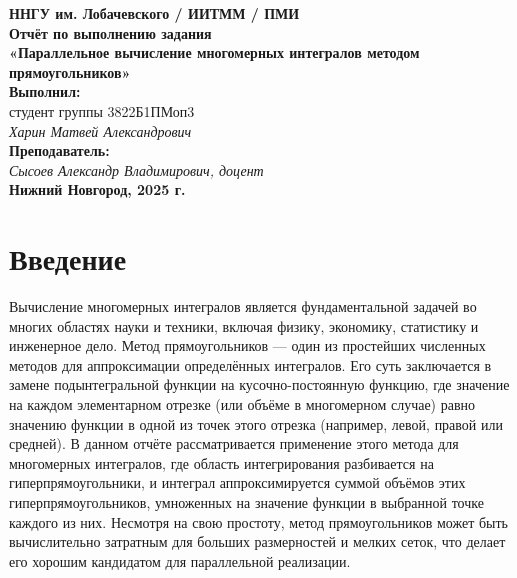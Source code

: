 \documentclass[12pt]{article}
\begin{document}
\begin{titlepage}
    \begin{center}
        \large
        \textbf{ННГУ им. Лобачевского / ИИТММ / ПМИ}\\[0.5cm]

        \vspace{4cm}
        \textbf{\Large Отчёт по выполнению задания}\\
        \textbf{\large «Параллельное вычисление многомерных интегралов методом прямоугольников»}\\[3cm] %

        \vspace{3cm}
        \textbf{Выполнил:}\\
        студент группы 3822Б1ПМоп3 \\
        \textit{Харин Матвей Александрович}\\[1cm]

        \textbf{Преподаватель:}\\
        \textit{Сысоев Александр Владимирович, доцент}\\[2cm]

        \vfill
        \textbf{Нижний Новгород, 2025 г.}
    \end{center}
\end{titlepage}

\tableofcontents
\newpage

\section{Введение}
Вычисление многомерных интегралов является фундаментальной задачей во многих областях науки и техники, включая физику, экономику, статистику и инженерное дело. Метод прямоугольников — один из простейших численных методов для аппроксимации определённых интегралов. Его суть заключается в замене подынтегральной функции на кусочно-постоянную функцию, где значение на каждом элементарном отрезке (или объёме в многомерном случае) равно значению функции в одной из точек этого отрезка (например, левой, правой или средней). В данном отчёте рассматривается применение этого метода для многомерных интегралов, где область интегрирования разбивается на гиперпрямоугольники, и интеграл аппроксимируется суммой объёмов этих гиперпрямоугольников, умноженных на значение функции в выбранной точке каждого из них. Несмотря на свою простоту, метод прямоугольников может быть вычислительно затратным для больших размерностей и мелких сеток, что делает его хорошим кандидатом для параллельной реализации.
\end{document}
